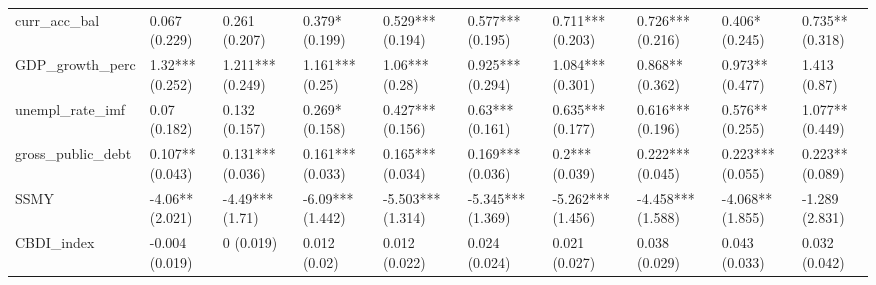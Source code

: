 \begin{table}[ht]
\begin{tabular}{llllllllll}
  curr\_acc\_bal & 0.067 (0.229) & 0.261 (0.207) & 0.379* (0.199) & 0.529*** (0.194) & 0.577*** (0.195) & 0.711*** (0.203) & 0.726*** (0.216) & 0.406* (0.245) & 0.735** (0.318) \\ 
  GDP\_growth\_perc & 1.32*** (0.252) & 1.211*** (0.249) & 1.161*** (0.25) & 1.06*** (0.28) & 0.925*** (0.294) & 1.084*** (0.301) & 0.868** (0.362) & 0.973** (0.477) & 1.413 (0.87) \\ 
  unempl\_rate\_imf & 0.07 (0.182) & 0.132 (0.157) & 0.269* (0.158) & 0.427*** (0.156) & 0.63*** (0.161) & 0.635*** (0.177) & 0.616*** (0.196) & 0.576** (0.255) & 1.077** (0.449) \\ 
  gross\_public\_debt & 0.107** (0.043) & 0.131*** (0.036) & 0.161*** (0.033) & 0.165*** (0.034) & 0.169*** (0.036) & 0.2*** (0.039) & 0.222*** (0.045) & 0.223*** (0.055) & 0.223** (0.089) \\ 
  SSMY & -4.06** (2.021) & -4.49*** (1.71) & -6.09*** (1.442) & -5.503*** (1.314) & -5.345*** (1.369) & -5.262*** (1.456) & -4.458*** (1.588) & -4.068** (1.855) & -1.289 (2.831) \\ 
  CBDI\_index & -0.004 (0.019) & 0 (0.019) & 0.012 (0.02) & 0.012 (0.022) & 0.024 (0.024) & 0.021 (0.027) & 0.038 (0.029) & 0.043 (0.033) & 0.032 (0.042) \\ 
   \bottomrule
\end{tabular}
\endgroup
\end{table}

